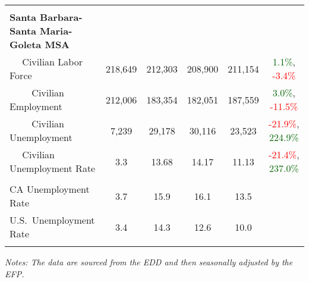 \documentclass[12pt]{article}
\begin{document}
\begin{landscape}
\begin{table}
\begin{tabular}{|l|c|c|c|c|c|}
&&&&& \\
\textbf{Santa Barbara-Santa Maria-Goleta MSA} &&&&& \\
$\quad$ Civilian Labor Force &218,649 & 212,303 & 208,900 & 211,154 & \textcolor{darkgreen}{1.1\%}, \textcolor{red}{-3.4\%} \\
$\qquad$ \small Civilian Employment &212,006 & 183,354 & 182,051 & 187,559 & \textcolor{darkgreen}{3.0\%}, \textcolor{red}{-11.5\%} \\
$\qquad$ \small Civilian Unemployment &7,239 & 29,178 & 30,116 & 23,523 & \textcolor{red}{-21.9\%}, \textcolor{darkgreen}{224.9\%} \\
$\quad$ Civilian Unemployment Rate &3.3 & 13.68 & 14.17 & 11.13 & \textcolor{red}{-21.4\%}, \textcolor{darkgreen}{237.0\%} \\
&&&&& \\
CA Unemployment Rate & 3.7 & 15.9 & 16.1 & 13.5 & \\
U.S.\ Unemployment Rate & 3.4 & 14.3 & 12.6 & 10.0 & \\
& & & & & \\ \hline \hline
\end{tabular}
\par
\vspace{.5em}
\footnotesize
\textit{Notes: The data are sourced from the EDD and then seasonally adjusted by the EFP.}
\end{table}
\end{landscape}
\end{document}
